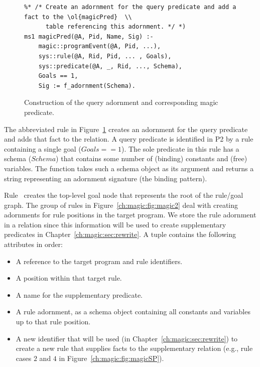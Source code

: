 \begin{figure}[!t]
\ssp
\centering
\begin{lstlisting}
%* /* Create an adornment for the query predicate and add a fact to the \ol{magicPred}  \\
      table referencing this adornment. */ *)
ms1 magicPred(@A, Pid, Name, Sig) :-
    magic::programEvent(@A, Pid, ...),
    sys::rule(@A, Rid, Pid, ... , Goals),
    sys::predicate(@A, _, Rid, ..., Schema),
    Goals == 1,
    Sig := f_adornment(Schema).
\end{lstlisting}
\caption{\label{ch:magic:fig:magic1}Construction of the query adornment and corresponding magic predicate.}
\end{figure}

The abbreviated rule in Figure~\ref{ch:magic:fig:magic1} creates an adornment
for the query predicate and adds that fact to the  relation.  A
query predicate is identified in P2 by a rule containing a single goal ($Goals
== 1$).  The sole predicate in this rule has a schema ($Schema$) that contains
some number of (binding) constants and (free) variables.  The function  
takes such a schema object as its argument and returns a string
representing an adornment signature (the binding pattern).

Rule~ creates the top-level goal node that represents the root of the
rule/goal graph.  The group of rules in Figure~\ref{ch:magic:fig:magic2} deal
with creating adornments for rule positions in the target program.  We store
the rule adornment in a  relation since this information will be used
to create supplementary predicates in Chapter~\ref{ch:magic:sec:rewrite}.  A
 tuple contains the following attributes in order:
\begin{itemize}
   \ssp
  \item A reference to the target program and rule identifiers. 
  \item A position within that target rule.
  \item A name for the supplementary predicate.
  \item A rule adornment, as a schema object containing all constants and variables up to that rule position.
  \item A new identifier that will be used (in Chapter~\ref{ch:magic:sec:rewrite}) to create 
    a new rule that supplies facts to the supplementary relation (e.g., rule cases $2$ and $4$ 
    in Figure~\ref{ch:magic:fig:magicSP}).
\end{itemize}

